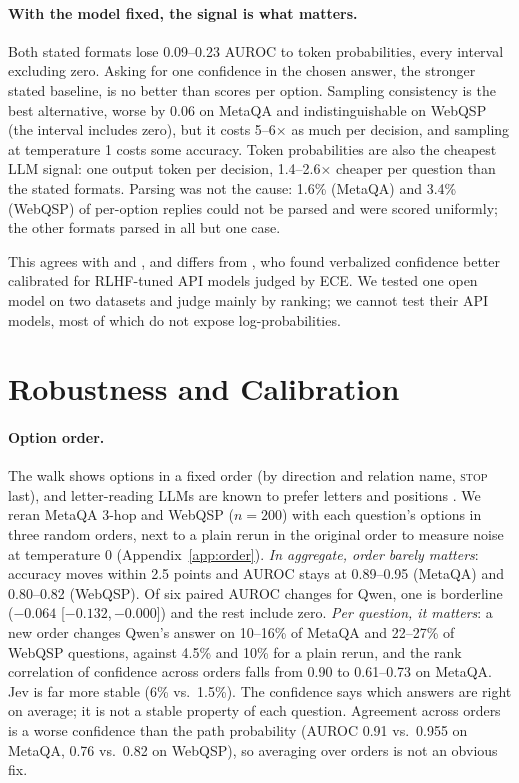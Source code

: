 \documentclass[11pt]{article}
\newcommand{\stopop}{\textsc{stop}}
\newcommand{\ci}[2]{{\scriptsize[#1,\,#2]}}
\begin{document}
\paragraph{With the model fixed, the signal is what matters.} Both stated formats lose
0.09--0.23 AUROC to token probabilities, every interval excluding zero. Asking for one
confidence in the chosen answer, the stronger stated baseline, is no better than scores
per option. Sampling consistency is the best alternative, worse by 0.06 on MetaQA and
indistinguishable on WebQSP (the interval includes zero), but it costs 5--6$\times$ as
much per decision, and sampling at temperature 1 costs some accuracy. Token probabilities are also the cheapest
LLM signal: one output token per decision, 1.4--2.6$\times$ cheaper per question than
the stated formats. Parsing was not the cause: 1.6\% (MetaQA) and 3.4\% (WebQSP) of
per-option replies could not be parsed and were scored uniformly; the other formats
parsed in all but one case.

This agrees with \citet{kadavath2022know} and \citet{xiong2024express}, and differs from
\citet{tian2023just}, who found verbalized confidence better calibrated for RLHF-tuned
API models judged by ECE. We tested one open model on two datasets and judge mainly by
ranking; we cannot test their API models, most of which do not expose log-probabilities.

\section{Robustness and Calibration}
\label{sec:robust}

\paragraph{Option order.} The walk shows options in a fixed order (by direction and
relation name, \stopop{} last), and letter-reading LLMs are known to prefer letters and
positions \citep{zheng2024mcq,pezeshkpour2024order}. We reran MetaQA 3-hop and WebQSP
($n=200$) with each question's options in three random orders, next to a plain rerun in
the original order to measure noise at temperature 0 (Appendix~\ref{app:order}).
\emph{In aggregate, order barely matters}: accuracy moves within 2.5 points and AUROC
stays at 0.89--0.95 (MetaQA) and 0.80--0.82 (WebQSP). Of six paired AUROC changes for
Qwen, one is borderline ($-0.064$ \ci{$-0.132$}{$-0.000$}) and the rest include zero.
\emph{Per question, it matters}: a new order changes Qwen's answer on 10--16\% of MetaQA
and 22--27\% of WebQSP questions, against 4.5\% and 10\% for a plain rerun, and the rank
correlation of confidence across orders falls from 0.90 to 0.61--0.73 on MetaQA. Jev is
far more stable (6\% vs.\ 1.5\%). The confidence says which answers are right on
average; it is not a stable property of each question. Agreement across orders is a
worse confidence than the path probability (AUROC 0.91 vs.\ 0.955 on MetaQA, 0.76 vs.\
0.82 on WebQSP), so averaging over orders is not an obvious fix.
\end{document}
